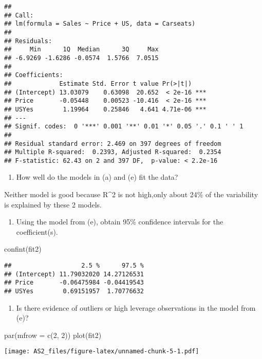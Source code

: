 \documentclass[
]{article}
\newenvironment{Shaded}{\begin{snugshade}}{\end{snugshade}}
\newcommand{\AttributeTok}[1]{\textcolor[rgb]{0.77,0.63,0.00}{#1}}
\newcommand{\DecValTok}[1]{\textcolor[rgb]{0.00,0.00,0.81}{#1}}
\newcommand{\FunctionTok}[1]{\textcolor[rgb]{0.00,0.00,0.00}{#1}}
\newcommand{\NormalTok}[1]{#1}
\providecommand{\tightlist}{%
  \setlength{\itemsep}{0pt}\setlength{\parskip}{0pt}}
\begin{document}
\begin{verbatim}
## 
## Call:
## lm(formula = Sales ~ Price + US, data = Carseats)
## 
## Residuals:
##     Min      1Q  Median      3Q     Max 
## -6.9269 -1.6286 -0.0574  1.5766  7.0515 
## 
## Coefficients:
##             Estimate Std. Error t value Pr(>|t|)    
## (Intercept) 13.03079    0.63098  20.652  < 2e-16 ***
## Price       -0.05448    0.00523 -10.416  < 2e-16 ***
## USYes        1.19964    0.25846   4.641 4.71e-06 ***
## ---
## Signif. codes:  0 '***' 0.001 '**' 0.01 '*' 0.05 '.' 0.1 ' ' 1
## 
## Residual standard error: 2.469 on 397 degrees of freedom
## Multiple R-squared:  0.2393, Adjusted R-squared:  0.2354 
## F-statistic: 62.43 on 2 and 397 DF,  p-value: < 2.2e-16
\end{verbatim}

\begin{enumerate}
\def\labelenumi{(\alph{enumi})}
\setcounter{enumi}{5}
\tightlist
\item
  How well do the models in (a) and (e) fit the data?
\end{enumerate}

Neither model is good because R\^{}2 is not high,only about 24\% of the
variability is explained by these 2 models.

\begin{enumerate}
\def\labelenumi{(\alph{enumi})}
\setcounter{enumi}{6}
\tightlist
\item
  Using the model from (e), obtain 95\% confidence intervals for the
  coefficient(s).
\end{enumerate}

\begin{Shaded}
\begin{Highlighting}[]
\FunctionTok{confint}\NormalTok{(fit2)}
\end{Highlighting}
\end{Shaded}

\begin{verbatim}
##                   2.5 %      97.5 %
## (Intercept) 11.79032020 14.27126531
## Price       -0.06475984 -0.04419543
## USYes        0.69151957  1.70776632
\end{verbatim}

\begin{enumerate}
\def\labelenumi{(\alph{enumi})}
\setcounter{enumi}{7}
\tightlist
\item
  Is there evidence of outliers or high leverage observations in the
  model from (e)?
\end{enumerate}

\begin{Shaded}
\begin{Highlighting}[]
\FunctionTok{par}\NormalTok{(}\AttributeTok{mfrow =} \FunctionTok{c}\NormalTok{(}\DecValTok{2}\NormalTok{, }\DecValTok{2}\NormalTok{))}
\FunctionTok{plot}\NormalTok{(fit2)}
\end{Highlighting}
\end{Shaded}

\texttt{[image: AS2\_files/figure-latex/unnamed-chunk-5-1.pdf]}
\end{document}
